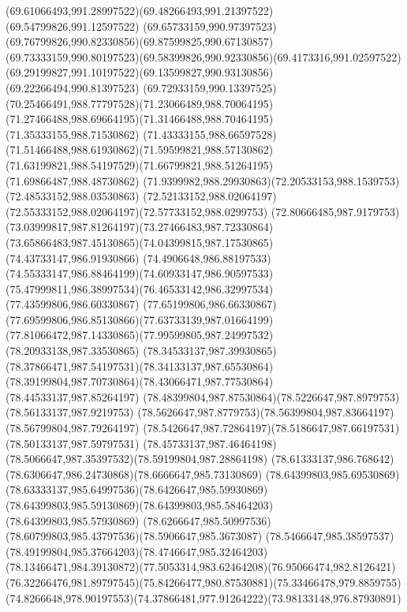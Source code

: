 {{  \curveto(69.61066493,991.28997522)(69.48266493,991.21397522)(69.54799826,991.12597522)
  \curveto(69.65733159,990.97397523)(69.76799826,990.82330856)(69.87599825,990.67130857)
  \curveto(69.73333159,990.80197523)(69.58399826,990.92330856)(69.4173316,991.02597522)
  \curveto(69.29199827,991.10197522)(69.13599827,990.93130856)(69.22266494,990.81397523)
  \curveto(69.72933159,990.13397525)(70.25466491,988.77797528)(71.23066489,988.70064195)
  \curveto(71.27466488,988.69664195)(71.31466488,988.70464195)(71.35333155,988.71530862)
  \curveto(71.43333155,988.66597528)(71.51466488,988.61930862)(71.59599821,988.57130862)
  \curveto(71.63199821,988.54197529)(71.66799821,988.51264195)(71.69866487,988.48730862)
  \curveto(71.9399982,988.29930863)(72.20533153,988.1539753)(72.48533152,988.03530863)
  \curveto(72.52133152,988.02064197)(72.55333152,988.02064197)(72.57733152,988.0299753)
  \curveto(72.80666485,987.9179753)(73.03999817,987.81264197)(73.27466483,987.72330864)
  \curveto(73.65866483,987.45130865)(74.04399815,987.17530865)(74.43733147,986.91930866)
  \curveto(74.4906648,986.88197533)(74.55333147,986.88464199)(74.60933147,986.90597533)
  \curveto(75.47999811,986.38997534)(76.46533142,986.32997534)(77.43599806,986.60330867)
  \curveto(77.65199806,986.66330867)(77.69599806,986.85130866)(77.63733139,987.01664199)
  \curveto(77.81066472,987.14330865)(77.99599805,987.24997532)(78.20933138,987.33530865)
  \curveto(78.34533137,987.39930865)(78.37866471,987.54197531)(78.34133137,987.65530864)
  \curveto(78.39199804,987.70730864)(78.43066471,987.77530864)(78.44533137,987.85264197)
  \curveto(78.48399804,987.87530864)(78.5226647,987.8979753)(78.56133137,987.9219753)
  \curveto(78.5626647,987.8779753)(78.56399804,987.83664197)(78.56799804,987.79264197)
  \curveto(78.5426647,987.72864197)(78.5186647,987.66197531)(78.50133137,987.59797531)
  \curveto(78.45733137,987.46464198)(78.5066647,987.35397532)(78.59199804,987.28864198)
  \curveto(78.61333137,986.768642)(78.6306647,986.24730868)(78.6666647,985.73130869)
  \curveto(78.64399803,985.69530869)(78.63333137,985.64997536)(78.6426647,985.59930869)
  \curveto(78.64399803,985.59130869)(78.64399803,985.58464203)(78.64399803,985.57930869)
  \curveto(78.6266647,985.50997536)(78.60799803,985.43797536)(78.5906647,985.3673087)
  \curveto(78.5466647,985.38597537)(78.49199804,985.37664203)(78.4746647,985.32464203)
  \curveto(78.13466471,984.39130872)(77.5053314,983.62464208)(76.95066474,982.8126421)
  \curveto(76.32266476,981.89797545)(75.84266477,980.87530881)(75.33466478,979.8859755)
  \curveto(74.8266648,978.90197553)(74.37866481,977.91264222)(73.98133148,976.87930891)
}}
